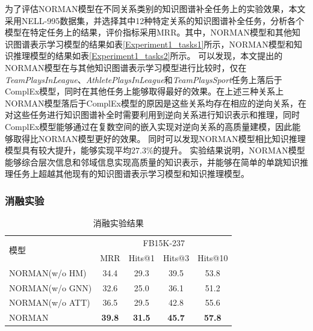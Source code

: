 \documentclass[algorithmlist, AutoFakeBold, AutoFakeSlant, figurelist, tablelist, nomlist, engineering, openany]{seuthesix} %
\begin{document}
为了评估NORMAN模型在不同关系类别的知识图谱补全任务上的实验效果，本文采用NELL-995数据集，并选择其中12种特定关系的知识图谱补全任务，分析各个模型在特定任务上的结果，评价指标采用MRR。其中，NORMAN模型和其他知识图谱表示学习模型的结果如表\ref{Experiment1_tasks1}所示，NORMAN模型和知识推理模型的结果如表\ref{Experiment1_tasks2}所示。
可以发现，本文提出的NORMAN模型在与其他知识图谱表示学习模型进行比较时，仅在\textit{TeamPlaysInLeague}、\textit{AthletePlaysInLeague}和\textit{TeamPlaysSport}任务上落后于ComplEx模型，同时在其他任务上能够取得最好的效果。在上述三种关系上NORMAN模型落后于ComplEx模型的原因是这些关系均存在相应的逆向关系，在对这些任务进行知识图谱补全时需要利用到逆向关系进行知识表示和推理，同时ComplEx模型能够通过在复数空间的嵌入实现对逆向关系的高质量建模，因此能够取得比NORMAN模型更好的效果。
同时可以发现NORMAN模型相比知识推理模型具有较大提升，能够实现平均$27.3\%$的提升。
实验结果说明，NORMAN模型能够综合层次信息和邻域信息实现高质量的知识表示，并能够在简单的单跳知识推理任务上超越其他现有的知识图谱表示学习模型和知识推理模型。

\subsubsection{消融实验}
\begin{table}[t]
  \centering
  \caption{消融实验结果}
  \begin{tabular*}{0.95\textwidth}{@{\extracolsep{\fill}}lcccc}
    \toprule[1pt]
    \multirow{2}{*}{模型} & \multicolumn{4}{c}{FB15K-237} \\
      & MRR & Hits@1 & Hits@3 & Hits@10 \\ \hline
    NORMAN(w/o HM) & 34.4 & 29.3 & 39.5 & 53.8 \\
    NORMAN(w/o GNN) & 32.6 & 25.0 & 36.1 & 51.2 \\
    NORMAN(w/o ATT) & 36.5 & 29.5 & 42.8 & 55.6 \\
    NORMAN & \textbf{39.8} & \textbf{31.5} & \textbf{45.7} & \textbf{57.8} \\
    \bottomrule[1pt]
  \end{tabular*}
  \label{Experiment1_ablation}
\end{table}
\end{document}
